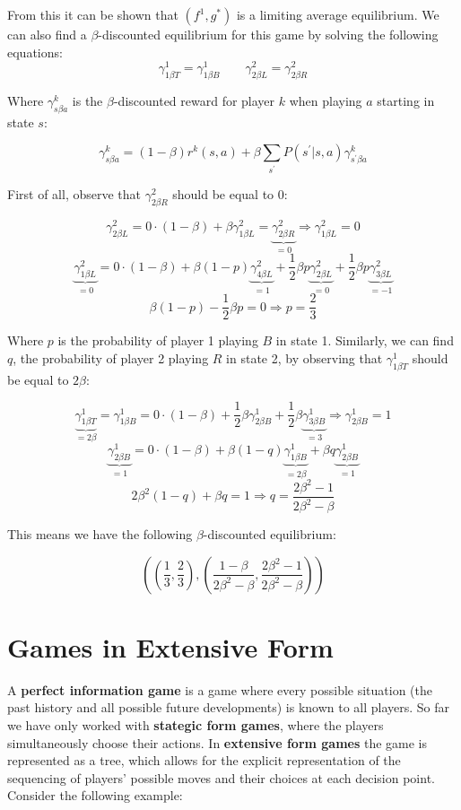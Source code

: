 \documentclass[12pt]{article}
\begin{document}
\noindent
From this it can be shown that $(f^1, g^\ast)$ is a limiting average equilibrium.
We can also find a $\beta$-discounted equilibrium for this game 
by solving the following equations:
\[ \gamma^1_{1 \beta T} = \gamma^1_{1 \beta B} \quad \quad \gamma^2_{2 \beta L} = \gamma^2_{2 \beta R} \]

\noindent
Where $\gamma^k_{s \beta a}$ is the $\beta$-discounted reward for player $k$ when playing $a$ starting in state $s$:

\[ \gamma^k_{s \beta a} = (1 - \beta) r^k(s, a) + \beta \sum_{s^\prime} P(s^\prime | s, a) \gamma^k_{s^\prime \beta a} \]

\noindent
First of all, observe that $\gamma^2_{2 \beta R}$ should be equal to 0:

\[ \gamma^2_{2 \beta L} = 0 \cdot (1 - \beta) + \beta \gamma^2_{1 \beta L} = \underbrace{\gamma^2_{2 \beta R}}_{=0} \Longrightarrow \gamma^2_{1 \beta L} = 0 \]
\[ \underbrace{\gamma^2_{1 \beta L}}_{=0} = 0 \cdot (1 - \beta) + \beta (1 - p) \underbrace{\gamma^2_{4 \beta L}}_{=1} + \frac{1}{2} \beta p \underbrace{\gamma^2_{2 \beta L}}_{=0} + \frac{1}{2} \beta p \underbrace{\gamma^2_{3 \beta L}}_{=-1} \]
\[ \beta (1 - p) - \frac{1}{2} \beta p = 0 \Longrightarrow p = \frac{2}{3} \]

\noindent
Where $p$ is the probability of player 1 playing $B$ in state 1.
Similarly, we can find $q$, the probability of player 2 playing $R$ in state 2, by observing that $\gamma^1_{1 \beta T}$ should be equal to $2\beta$:

\[ \underbrace{\gamma^1_{1 \beta T}}_{=2\beta} = \gamma^1_{1 \beta B} = 0 \cdot (1 - \beta) + \frac{1}{2} \beta \gamma^1_{2 \beta B} + \frac{1}{2} \beta \underbrace{\gamma^1_{3 \beta B}}_{=3} \Longrightarrow \gamma^1_{2 \beta B} = 1 \]
\[ \underbrace{\gamma^1_{2 \beta B}}_{=1} = 0 \cdot (1 - \beta) + \beta (1 - q) \underbrace{\gamma^1_{1 \beta B}}_{=2\beta} + \beta q \underbrace{\gamma^1_{2 \beta B}}_{=1} \]
\[ 2\beta^2(1 - q) + \beta q = 1 \Longrightarrow q = \frac{2\beta^2 - 1}{2\beta^2 - \beta} \]

\noindent
This means we have the following $\beta$-discounted equilibrium:

\[ \left( \left( \frac{1}{3}, \frac{2}{3} \right), \left( \frac{1 - \beta}{2\beta^2 - \beta}, \frac{2\beta^2 - 1}{2\beta^2 - \beta} \right) \right) \]

%
%
\newpage
\section{Games in Extensive Form}
A \textbf{perfect information game} is a game where every possible situation (the past history and all possible future developments) is known to all players.
So far we have only worked with \textbf{stategic form games}, where the players simultaneously choose their actions.
In \textbf{extensive form games} the game is represented as a tree, which allows for the explicit representation of the sequencing of players' possible moves and their choices at each decision point.
Consider the following example:
\end{document}
